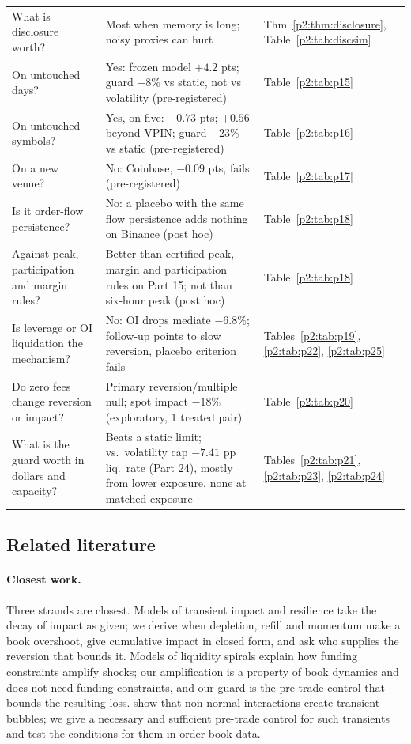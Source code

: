 {\begin{longtable}{p{}p{}p{}}
What is disclosure worth? & Most when memory is long; noisy proxies can hurt & Thm~\ref{p2:thm:disclosure}, Table~\ref{p2:tab:discsim}\\
On untouched days? & Yes: frozen model $+4.2$ pts; guard $-8\%$ vs static, not vs volatility (pre-registered) & Table~\ref{p2:tab:p15}\\
On untouched symbols? & Yes, on five: $+0.73$ pts; $+0.56$ beyond VPIN; guard $-23\%$ vs static (pre-registered) & Table~\ref{p2:tab:p16}\\
On a new venue? & No: Coinbase, $-0.09$ pts, fails (pre-registered) & Table~\ref{p2:tab:p17}\\
Is it order-flow persistence? & No: a placebo with the same flow persistence adds nothing on Binance (post hoc) & Table~\ref{p2:tab:p18}\\
Against peak, participation and margin rules? & Better than certified peak, margin and participation rules on Part 15; not than six-hour peak (post hoc) & Table~\ref{p2:tab:p18}\\
Is leverage or OI liquidation the mechanism? & No: OI drops mediate $-6.8\%$; follow-up points to slow reversion, placebo criterion fails & Tables~\ref{p2:tab:p19}, \ref{p2:tab:p22}, \ref{p2:tab:p25}\\
Do zero fees change reversion or impact? & Primary reversion/multiple null; spot impact $-18\%$ (exploratory, 1 treated pair) & Table~\ref{p2:tab:p20}\\
What is the guard worth in dollars and capacity? & Beats a static limit; vs.\ volatility cap $-7.41$ pp liq.\ rate (Part 24), mostly from lower exposure, none at matched exposure & Tables~\ref{p2:tab:p21}, \ref{p2:tab:p23}, \ref{p2:tab:p24}\\
\bottomrule
\end{longtable}}


\subsection{Related literature}

\paragraph{Closest work.} Three strands are closest. Models of transient impact and resilience \citep{p2:obizhaeva2013,p2:bouchaud2004,p2:bouchaud2018} take the decay of impact as given; we derive when depletion, refill and momentum make a book overshoot, give cumulative impact in closed form, and ask who supplies the reversion that bounds it. Models of liquidity spirals \citep{p2:brunnermeier2009,p2:shleifer1992} explain how funding constraints amplify shocks; our amplification is a property of book dynamics and does not need funding constraints, and our guard is the pre-trade control that bounds the resulting loss. \citet{p2:sornette2023} show that non-normal interactions create transient bubbles; we give a necessary and sufficient pre-trade control for such transients and test the conditions for them in order-book data.

